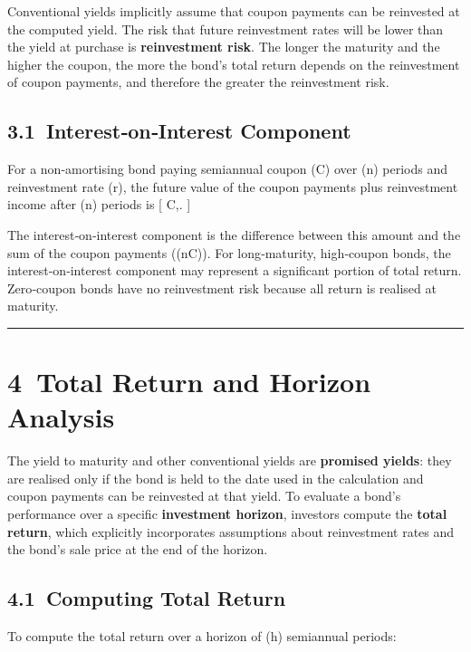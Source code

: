 \documentclass[
  letterpaper,
  DIV=11,
  numbers=noendperiod]{scrartcl}
\begin{document}
Conventional yields implicitly assume that coupon payments can be
reinvested at the computed yield. The risk that future reinvestment
rates will be lower than the yield at purchase is \textbf{reinvestment
risk}. The longer the maturity and the higher the coupon, the more the
bond's total return depends on the reinvestment of coupon payments, and
therefore the greater the reinvestment risk.

\subsection{3.1~Interest‐on‐Interest
Component}\label{interestoninterest-component}

For a non‑amortising bond paying semiannual coupon (C) over (n) periods
and reinvestment rate (r), the future value of the coupon payments plus
reinvestment income after (n) periods is {[} C,.
{]}

The interest‑on‑interest component is the difference between this amount
and the sum of the coupon payments ((nC)). For long‑maturity,
high‑coupon bonds, the interest‑on‑interest component may represent a
significant portion of total return. Zero‑coupon bonds have no
reinvestment risk because all return is realised at maturity.

\begin{center}\rule{0.5\linewidth}{0.5pt}\end{center}

\section{4~Total Return and Horizon
Analysis}\label{total-return-and-horizon-analysis}

The yield to maturity and other conventional yields are \textbf{promised
yields}: they are realised only if the bond is held to the date used in
the calculation and coupon payments can be reinvested at that yield. To
evaluate a bond's performance over a specific \textbf{investment
horizon}, investors compute the \textbf{total return}, which explicitly
incorporates assumptions about reinvestment rates and the bond's sale
price at the end of the horizon.

\subsection{4.1~Computing Total Return}\label{computing-total-return}

To compute the total return over a horizon of (h) semiannual periods:
\end{document}
